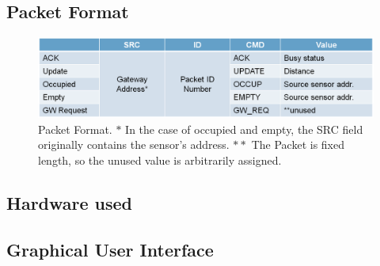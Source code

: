 \subsection{Packet Format}
\begin{figure}
    \centering
    \includegraphics[width=15cm]{images/General_PacketFormat.png}
	\vspace{-1.5em}
    \caption[Packet format]{Packet Format. 
	\(\ast\) In the case of occupied and empty, the SRC field originally contains the sensor's address.
	\(\ast\ast\) The Packet is fixed length, so the unused value is arbitrarily assigned.}
    \vspace{-1.5em}
    \label{fig:packet}
\end{figure}

\subsection{Hardware used}

\subsection{Graphical User Interface}

